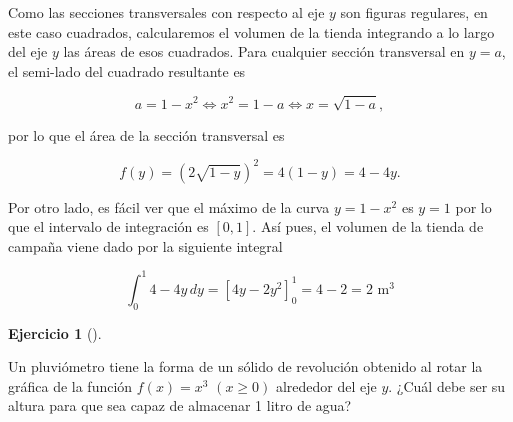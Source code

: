 \documentclass[
  spanish,
  a4paper,
]{scrreport}
\theoremstyle{definition}
\newtheorem{exercise}{Ejercicio}[chapter]
\theoremstyle{remark}
\begin{document}
\begin{tcolorbox}[enhanced jigsaw, arc=.35mm, bottomrule=.15mm, bottomtitle=1mm, breakable, colback=white, colbacktitle=quarto-callout-tip-color!10!white, colframe=quarto-callout-tip-color-frame, coltitle=black, left=2mm, leftrule=.75mm, opacityback=0, opacitybacktitle=0.6, rightrule=.15mm, title=\textcolor{quarto-callout-tip-color}{\faLightbulb}\hspace{0.5em}{Solución}, titlerule=0mm, toprule=.15mm, toptitle=1mm]

Como las secciones transversales con respecto al eje \(y\) son figuras
regulares, en este caso cuadrados, calcularemos el volumen de la tienda
integrando a lo largo del eje \(y\) las áreas de esos cuadrados. Para
cualquier sección transversal en \(y=a\), el semi-lado del cuadrado
resultante es

\[
a=1-x^2 \Leftrightarrow x^2 = 1-a \Leftrightarrow x = \sqrt{1-a},
\]

por lo que el área de la sección transversal es

\[
f(y) = (2\sqrt{1-y})^2 = 4(1-y)=4-4y.
\]

Por otro lado, es fácil ver que el máximo de la curva \(y=1-x^2\) es
\(y=1\) por lo que el intervalo de integración es \([0,1]\). Así pues,
el volumen de la tienda de campaña viene dado por la siguiente integral

\[
\int_0^1 4-4y\,dy 
= [4y-2y^2]_0^1 
= 4-2  
= 2 \mbox{ m}^3
\]

\end{tcolorbox}

\begin{exercise}[]\protect\hypertarget{exr-pluviometro}{}\label{exr-pluviometro}

Un pluviómetro tiene la forma de un sólido de revolución obtenido al
rotar la gráfica de la función \(f(x)=x^3\) \((x\geq 0)\) alrededor del
eje \(y\). ¿Cuál debe ser su altura para que sea capaz de almacenar 1
litro de agua?

\end{exercise}
\end{document}
